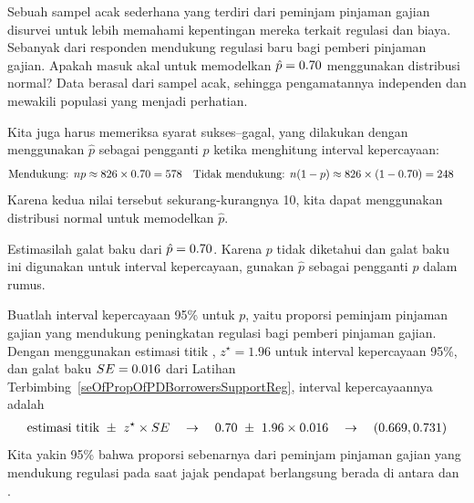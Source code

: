 \begin{examplewrap}
\begin{nexample}{Sebuah sampel acak sederhana yang terdiri dari \paydayN{}
    peminjam pinjaman gajian disurvei untuk lebih memahami
    kepentingan mereka terkait regulasi dan biaya.
    Sebanyak \paydayRegPerc{} dari responden mendukung
    regulasi baru bagi pemberi pinjaman gajian.
    Apakah masuk akal untuk memodelkan $\hat{p} = 0.70{}$
    menggunakan distribusi normal?}
  Data berasal dari sampel acak, sehingga pengamatannya
  independen dan mewakili populasi yang menjadi
  perhatian.

  Kita juga harus memeriksa syarat sukses--gagal,
  yang dilakukan dengan menggunakan $\hat{p}$ sebagai pengganti
  $p$ ketika menghitung interval kepercayaan:
  \begin{align*}
  \text{Mendukung: }
      n p &
          \approx 826{} \times 0.70{}
      = 578
  &\text{Tidak mendukung: }
      n (1 - p) &
        \approx 826{} \times (1 - 0.70{})
      = 248
  \end{align*}
  Karena kedua nilai tersebut sekurang-kurangnya 10, kita dapat menggunakan
  distribusi normal untuk memodelkan $\hat{p}$.
\end{nexample}
\end{examplewrap}




\begin{exercisewrap}
\begin{nexercise} \label{seOfPropOfPDBorrowersSupportReg}
Estimasilah galat baku dari $\hat{p} = 0.70{}$.
Karena $p$ tidak diketahui dan galat baku ini digunakan untuk
interval kepercayaan, gunakan $\hat{p}$ sebagai pengganti $p$
dalam rumus.\footnotemark
\end{nexercise}
\end{exercisewrap}

\begin{examplewrap}
\begin{nexample}{Buatlah interval kepercayaan 95\% untuk $p$,
    yaitu proporsi peminjam pinjaman gajian yang mendukung peningkatan
    regulasi bagi pemberi pinjaman gajian.}
  Dengan menggunakan
  estimasi titik \paydayRegProp{},
  $z^{\star} = 1.96$ untuk interval kepercayaan 95\%,
  dan
  galat baku $SE = 0.016{}$ dari
  Latihan Terbimbing~\ref{seOfPropOfPDBorrowersSupportReg},
  interval kepercayaannya adalah
  \begin{eqnarray*}
  \text{estimasi titik} \ \pm\ z^{\star} \times SE
      \quad\to\quad
      0.70{} \ \pm\ 1.96 \times 0.016{}
      \quad\to\quad
      (0.669{}, 0.731{})
  \end{eqnarray*}
  Kita yakin 95\% bahwa proporsi sebenarnya dari
  peminjam pinjaman gajian yang mendukung regulasi pada saat
  jajak pendapat berlangsung berada di antara \paydayRegLower{} dan
  \paydayRegUpper{}.
\end{nexample}
\end{examplewrap}

